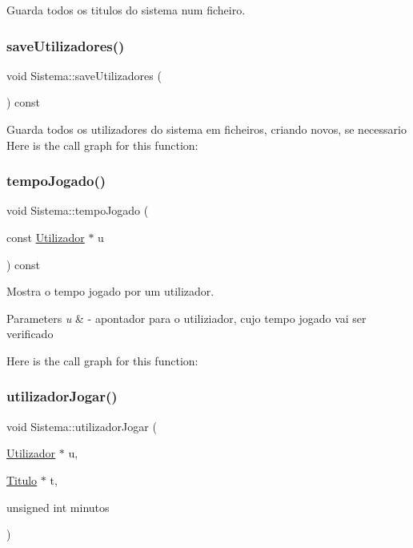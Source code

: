 Guarda todos os titulos do sistema num ficheiro. 

\mbox{\label{class_sistema_af25036f1b2d4abc30447c45f3c3237b8}} 
\subsubsection{\texorpdfstring{save\+Utilizadores()}{saveUtilizadores()}}
{\footnotesize\ttfamily void Sistema\+::save\+Utilizadores (\begin{DoxyParamCaption}{ }\end{DoxyParamCaption}) const}

Guarda todos os utilizadores do sistema em ficheiros, criando novos, se necessario Here is the call graph for this function\+:
\mbox{\label{class_sistema_a871ba21f5de12adb05106f0fcaf9d723}} 
\subsubsection{\texorpdfstring{tempo\+Jogado()}{tempoJogado()}}
{\footnotesize\ttfamily void Sistema\+::tempo\+Jogado (\begin{DoxyParamCaption}\item[{const \mbox{\hyperlink{class_utilizador}{Utilizador}} $\ast$}]{u }\end{DoxyParamCaption}) const}



Mostra o tempo jogado por um utilizador. 


\begin{DoxyParams}{Parameters}
{\em u} & -\/ apontador para o utiliziador, cujo tempo jogado vai ser verificado \\
\hline
\end{DoxyParams}
Here is the call graph for this function\+:
\mbox{\label{class_sistema_a43e1d500eca075857b1c96c2e2239d55}} 
\subsubsection{\texorpdfstring{utilizador\+Jogar()}{utilizadorJogar()}}
{\footnotesize\ttfamily void Sistema\+::utilizador\+Jogar (\begin{DoxyParamCaption}\item[{\mbox{\hyperlink{class_utilizador}{Utilizador}} $\ast$}]{u,  }\item[{\mbox{\hyperlink{class_titulo}{Titulo}} $\ast$}]{t,  }\item[{unsigned int}]{minutos }\end{DoxyParamCaption})}



